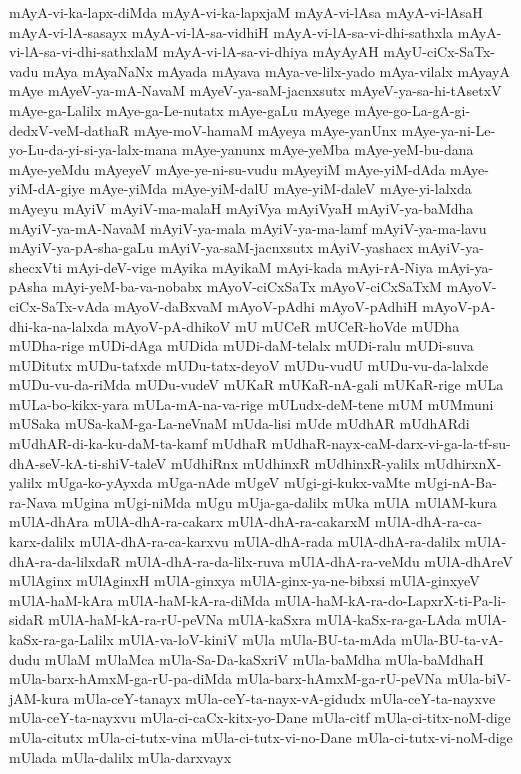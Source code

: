 {mAyA-vi-ka-lapx-diMda
mAyA-vi-ka-lapxjaM
mAyA-vi-lAsa
mAyA-vi-lAsaH
mAyA-vi-lA-sasayx
mAyA-vi-lA-sa-vidhiH
mAyA-vi-lA-sa-vi-dhi-sathxla
mAyA-vi-lA-sa-vi-dhi-sathxlaM
mAyA-vi-lA-sa-vi-dhiya
mAyAyAH
mAyU-ciCx-SaTx-vadu
mAya
mAyaNaNx
mAyada
mAyava
mAya-ve-lilx-yado
mAya-vilalx
mAyayA
mAye
mAyeV-ya-mA-NavaM
mAyeV-ya-saM-jacnxsutx
mAyeV-ya-sa-hi-tAsetxV
mAye-ga-Lalilx
mAye-ga-Le-nutatx
mAye-gaLu
mAyege
mAye-go-La-gA-gi-dedxV-veM-dathaR
mAye-moV-hamaM
mAyeya
mAye-yanUnx
mAye-ya-ni-Le-yo-Lu-da-yi-si-ya-lalx-mana
mAye-yanunx
mAye-yeMba
mAye-yeM-bu-dana
mAye-yeMdu
mAyeyeV
mAye-ye-ni-su-vudu
mAyeyiM
mAye-yiM-dAda
mAye-yiM-dA-giye
mAye-yiMda
mAye-yiM-dalU
mAye-yiM-daleV
mAye-yi-lalxda
mAyeyu
mAyiV
mAyiV-ma-malaH
mAyiVya
mAyiVyaH
mAyiV-ya-baMdha
mAyiV-ya-mA-NavaM
mAyiV-ya-mala
mAyiV-ya-ma-lamf
mAyiV-ya-ma-lavu
mAyiV-ya-pA-sha-gaLu
mAyiV-ya-saM-jacnxsutx
mAyiV-yashacx
mAyiV-ya-shecxVti
mAyi-deV-vige
mAyika
mAyikaM
mAyi-kada
mAyi-rA-Niya
mAyi-ya-pAsha
mAyi-yeM-ba-va-nobabx
mAyoV-ciCxSaTx
mAyoV-ciCxSaTxM
mAyoV-ciCx-SaTx-vAda
mAyoV-daBxvaM
mAyoV-pAdhi
mAyoV-pAdhiH
mAyoV-pA-dhi-ka-na-lalxda
mAyoV-pA-dhikoV
mU
mUCeR
mUCeR-hoVde
mUDha
mUDha-rige
mUDi-dAga
mUDida
mUDi-daM-telalx
mUDi-ralu
mUDi-suva
mUDitutx
mUDu-tatxde
mUDu-tatx-deyoV
mUDu-vudU
mUDu-vu-da-lalxde
mUDu-vu-da-riMda
mUDu-vudeV
mUKaR
mUKaR-nA-gali
mUKaR-rige
mULa
mULa-bo-kikx-yara
mULa-mA-na-va-rige
mULudx-deM-tene
mUM
mUMmuni
mUSaka
mUSa-kaM-ga-La-neVnaM
mUda-lisi
mUde
mUdhAR
mUdhARdi
mUdhAR-di-ka-ku-daM-ta-kamf
mUdhaR
mUdhaR-nayx-caM-darx-vi-ga-la-tf-su-dhA-seV-kA-ti-shiV-taleV
mUdhiRnx
mUdhinxR
mUdhinxR-yalilx
mUdhirxnX-yalilx
mUga-ko-yAyxda
mUga-nAde
mUgeV
mUgi-gi-kukx-vaMte
mUgi-nA-Ba-ra-Nava
mUgina
mUgi-niMda
mUgu
mUja-ga-dalilx
mUka
mUlA
mUlAM-kura
mUlA-dhAra
mUlA-dhA-ra-cakarx
mUlA-dhA-ra-cakarxM
mUlA-dhA-ra-ca-karx-dalilx
mUlA-dhA-ra-ca-karxvu
mUlA-dhA-rada
mUlA-dhA-ra-dalilx
mUlA-dhA-ra-da-lilxdaR
mUlA-dhA-ra-da-lilx-ruva
mUlA-dhA-ra-veMdu
mUlA-dhAreV
mUlAginx
mUlAginxH
mUlA-ginxya
mUlA-ginx-ya-ne-bibxsi
mUlA-ginxyeV
mUlA-haM-kAra
mUlA-haM-kA-ra-diMda
mUlA-haM-kA-ra-do-LapxrX-ti-Pa-li-sidaR
mUlA-haM-kA-ra-rU-peVNa
mUlA-kaSxra
mUlA-kaSx-ra-ga-LAda
mUlA-kaSx-ra-ga-Lalilx
mUlA-va-loV-kiniV
mUla
mUla-BU-ta-mAda
mUla-BU-ta-vA-dudu
mUlaM
mUlaMca
mUla-Sa-Da-kaSxriV
mUla-baMdha
mUla-baMdhaH
mUla-barx-hAmxM-ga-rU-pa-diMda
mUla-barx-hAmxM-ga-rU-peVNa
mUla-biV-jAM-kura
mUla-ceY-tanayx
mUla-ceY-ta-nayx-vA-gidudx
mUla-ceY-ta-nayxve
mUla-ceY-ta-nayxvu
mUla-ci-caCx-kitx-yo-Dane
mUla-citf
mUla-ci-titx-noM-dige
mUla-citutx
mUla-ci-tutx-vina
mUla-ci-tutx-vi-no-Dane
mUla-ci-tutx-vi-noM-dige
mUlada
mUla-dalilx
mUla-darxvayx
}
